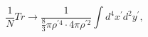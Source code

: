 \begin{equation}
\frac{1}{N}Tr \rightarrow 
\frac{1}{\frac{8}{3}\pi\rho^{\prime 4}
\cdot 4\pi \rho^{\prime 2}
}
\int d^{4}x^{\prime}d^{2}y^{\prime}, 
\end{equation}

